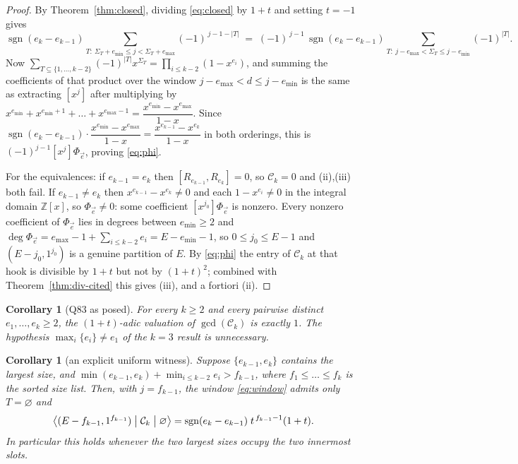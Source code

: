 \documentclass[11pt]{article}
\newtheorem{corollary}[theorem]{Corollary}
\theoremstyle{definition}
\newcommand{\Ck}{\mathcal{C}}
\newcommand{\Z}{\mathbb{Z}}
\DeclareMathOperator{\sgn}{sgn}
\begin{document}
\begin{proof}
By Theorem~\ref{thm:closed}, dividing \eqref{eq:closed} by $1+t$ and setting $t=-1$ gives
\[
  \sgn(e_k-e_{k-1})\sum_{T:\ \Sigma_T+e_{\min}\le j<\Sigma_T+e_{\max}}(-1)^{\,j-1-|T|}
  \;=\;(-1)^{\,j-1}\,\sgn(e_k-e_{k-1})\!\!\sum_{T:\ j-e_{\max}<\Sigma_T\le j-e_{\min}}\!\!(-1)^{|T|}.
\]
Now $\sum_{T\subseteq\{1,\dots,k-2\}}(-1)^{|T|}x^{\Sigma_T}=\prod_{i\le k-2}(1-x^{e_i})$, and
summing the coefficients of that product over the window
$j-e_{\max}<d\le j-e_{\min}$ is the same as extracting $[x^j]$ after multiplying by
$x^{e_{\min}}+x^{e_{\min}+1}+\dots+x^{e_{\max}-1}=\dfrac{x^{e_{\min}}-x^{e_{\max}}}{1-x}$.
Since $\sgn(e_k-e_{k-1})\cdot\dfrac{x^{e_{\min}}-x^{e_{\max}}}{1-x}=\dfrac{x^{e_{k-1}}-x^{e_k}}{1-x}$
in both orderings, this is $(-1)^{j-1}[x^j]\Phi_{\vec e}$, proving \eqref{eq:phi}.

For the equivalences: if $e_{k-1}=e_k$ then $[R_{e_{k-1}},R_{e_k}]=0$, so $\Ck_k=0$ and
(ii),(iii) both fail.  If $e_{k-1}\ne e_k$ then $x^{e_{k-1}}-x^{e_k}\ne0$ and each
$1-x^{e_i}\ne0$ in the integral domain $\Z[x]$, so $\Phi_{\vec e}\ne0$: some coefficient
$[x^{j_0}]\Phi_{\vec e}$ is nonzero.  Every nonzero coefficient of $\Phi_{\vec e}$ lies in
degrees between $e_{\min}\ge2$ and $\deg\Phi_{\vec e}=e_{\max}-1+\sum_{i\le k-2}e_i=E-e_{\min}-1$,
so $0\le j_0\le E-1$ and $(E-j_0,1^{j_0})$ is a genuine partition of $E$.  By \eqref{eq:phi}
the entry of $\Ck_k$ at that hook is divisible by $1+t$ but not by $(1+t)^2$; combined with
Theorem~\ref{thm:div-cited} this gives (iii), and a fortiori (ii).
\end{proof}

\begin{corollary}[Q83 as posed]\label{cor:q83}
For every $k\ge2$ and every pairwise distinct $e_1,\dots,e_k\ge2$, the $(1+t)$-adic
valuation of $\gcd(\Ck_k)$ is exactly $1$.  The hypothesis $\max_i\{e_i\}\ne e_1$ of the
$k=3$ result is unnecessary.
\end{corollary}

\begin{corollary}[an explicit uniform witness]\label{cor:explicit}
Suppose $\{e_{k-1},e_k\}$ contains the largest size, and
$\min(e_{k-1},e_k)+\min_{i\le k-2}e_i>f_{k-1}$, where $f_1\le\dots\le f_k$ is the sorted size
list.  Then, with $j=f_{k-1}$, the window \eqref{eq:window} admits only $T=\varnothing$ and
\[
  \bigl\langle (E-f_{k-1},1^{f_{k-1}})\bigm|\Ck_k\bigm|\varnothing\bigr\rangle
  =\sgn(e_k-e_{k-1})\;t^{\,f_{k-1}-1}(1+t).
\]
In particular this holds whenever the two largest sizes occupy the two innermost slots.
\end{corollary}
\end{document}
